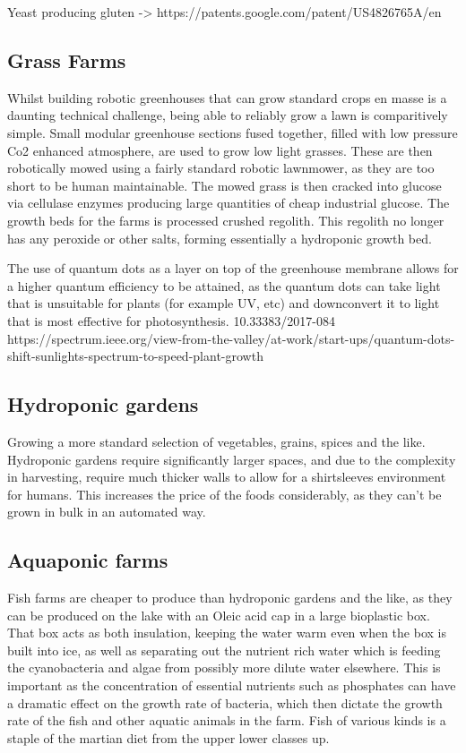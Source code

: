 \documentclass[10pt]{article}
\begin{document}
Yeast producing gluten -> https://patents.google.com/patent/US4826765A/en

\subsection{Grass Farms}
Whilst building robotic greenhouses that can grow standard crops en masse is a daunting technical challenge, being able to reliably grow a lawn is comparitively simple. Small modular greenhouse sections fused together, filled with low pressure Co2 enhanced atmosphere, are used to grow low light grasses. These are then robotically mowed using a fairly standard robotic lawnmower, as they are too short to be human maintainable. The mowed grass is then cracked into glucose via cellulase enzymes producing large quantities of cheap industrial glucose. The growth beds for the farms is processed crushed regolith. This regolith no longer has any peroxide or other salts, forming essentially a hydroponic growth bed.

The use of quantum dots as a layer on top of the greenhouse membrane allows for a higher quantum efficiency to be attained, as the quantum dots can take light that is unsuitable for plants (for example UV, etc) and downconvert it to light that is most effective for photosynthesis. 10.33383/2017-084 
https://spectrum.ieee.org/view-from-the-valley/at-work/start-ups/quantum-dots-shift-sunlights-spectrum-to-speed-plant-growth

\subsection{Hydroponic gardens}
Growing a more standard selection of vegetables, grains, spices and the like. Hydroponic gardens require significantly larger spaces, and due to the complexity in harvesting, require much thicker walls to allow for a shirtsleeves environment for humans. This increases the price of the foods considerably, as they can't be grown in bulk in an automated way.

\subsection{Aquaponic farms}
Fish farms are cheaper to produce than hydroponic gardens and the like, as they can be produced on the lake with an Oleic acid cap in a large bioplastic box. That box acts as both insulation, keeping the water warm even when the box is built into ice, as well as separating out the nutrient rich water which is feeding the cyanobacteria and algae from possibly more dilute water elsewhere. This is important as the concentration of essential nutrients such as phosphates can have a dramatic effect on the growth rate of bacteria, which then dictate the growth rate of the fish and other aquatic animals in the farm. Fish of various kinds is a staple of the martian diet from the upper lower classes up. 
\end{document}
